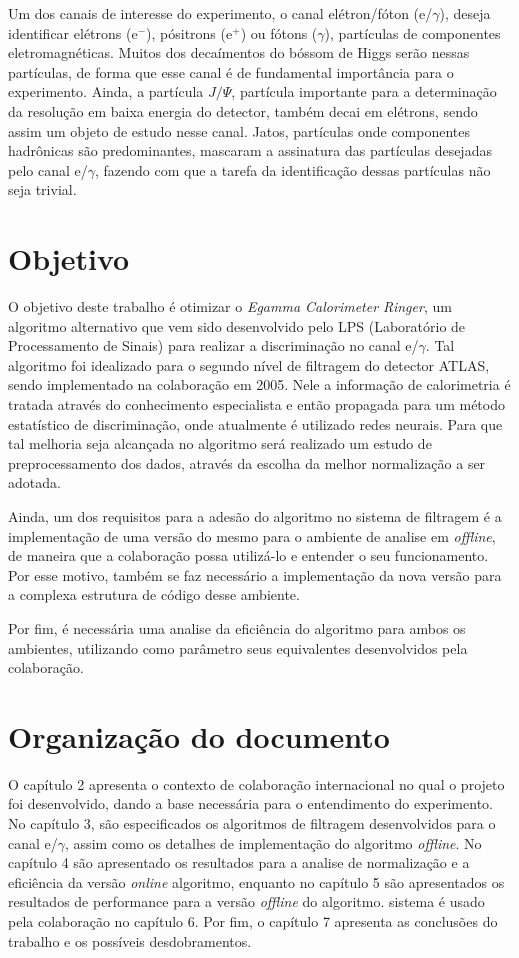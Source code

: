 Um dos canais de interesse do experimento, o canal elétron/fóton (e/$\gamma$),
deseja identificar elétrons (e$^-$), pósitrons (e$^+$) ou fótons ($\gamma$), 
partículas de componentes eletromagnéticas. Muitos dos decaímentos do bóssom de
Higgs serão nessas partículas, de forma que esse canal é de fundamental
importância para o experimento. Ainda, a partícula $J/\Psi$, partícula importante
para a determinação da resolução em baixa energia do detector, 
também decai em elétrons, sendo assim um objeto de estudo nesse canal.
Jatos, partículas onde componentes hadrônicas são predominantes, 
mascaram a assinatura das partículas desejadas pelo canal e/$\gamma$, fazendo 
com que a tarefa da identificação dessas partículas não seja trivial.

\section{Objetivo} %

O objetivo deste trabalho é otimizar o \emph{Egamma Calorimeter Ringer},
um algoritmo alternativo que vem sido desenvolvido pelo LPS (Laboratório 
de Processamento de Sinais) para realizar a discriminação 
no canal e/$\gamma$. Tal algoritmo foi idealizado para o segundo
nível de filtragem do detector ATLAS, sendo implementado na colaboração em 2005.
Nele a informação de calorimetria é tratada através do conhecimento especialista
e então propagada para um método estatístico 
de discriminação, onde atualmente é utilizado redes neurais. 
Para que tal melhoria seja alcançada no
algoritmo será realizado um estudo de preprocessamento dos dados,
através da escolha da melhor normalização a ser adotada.

Ainda, um dos requisitos para a adesão do algoritmo no sistema de filtragem é a
implementação de uma versão do mesmo para o ambiente de analise em {\it
offline}, de maneira  que a colaboração possa utilizá-lo e entender o seu
funcionamento. Por esse motivo, também se faz necessário a implementação 
da nova versão para a complexa estrutura de código desse ambiente.

Por fim, é necessária uma analise da eficiência do algoritmo para ambos os
ambientes, utilizando como parâmetro seus equivalentes desenvolvidos pela colaboração.

\section{Organização do documento} %

O capítulo 2 apresenta o contexto de colaboração internacional no qual o projeto
foi desenvolvido, dando a base necessária para o entendimento do experimento. No
capítulo 3, são especificados os algoritmos de filtragem desenvolvidos para o
canal e/$\gamma$, assim como os detalhes de implementação do algoritmo
\emph{offline}. No capítulo 4 são apresentado os resultados para a analise de
normalização e a eficiência da versão {\it online} algoritmo, enquanto no
capítulo 5 são apresentados os resultados de performance para a versão {\it
offline} do algoritmo. 
sistema é usado pela colaboração no capítulo 6. Por fim, o capítulo 7 apresenta
as conclusões do trabalho e os possíveis desdobramentos.

